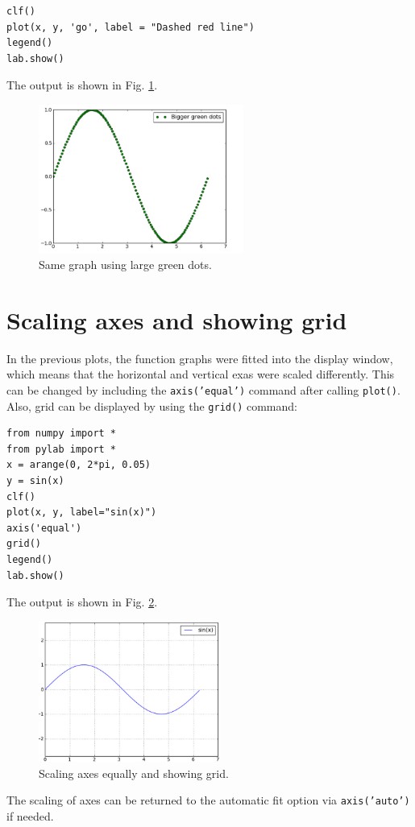 \documentclass{article}
\begin{document}
\begin{verbatim}
clf()
plot(x, y, 'go', label = "Dashed red line")
legend()
lab.show()
\end{verbatim}
\noindent
The output is shown in Fig. \ref{fig:plot5}.

\begin{figure}[!ht]
\begin{center}
\includegraphics[width=0.6\textwidth]{img/plot5.png}
\end{center}
\vspace{-6mm}
\caption{Same graph using large green dots.}
\label{fig:plot5}
\end{figure}
\noindent

\section{Scaling axes and showing grid}

In the previous plots, the function graphs were fitted into the 
display window, which means that the horizontal and vertical 
exas were scaled differently. This can be changed by including the 
{\tt axis('equal')} command after calling {\tt plot()}. Also, 
grid can be displayed by using the {\tt grid()} command:

\begin{verbatim}
from numpy import *
from pylab import *
x = arange(0, 2*pi, 0.05)
y = sin(x)
clf()
plot(x, y, label="sin(x)")
axis('equal')
grid()
legend()
lab.show()
\end{verbatim}
\noindent
The output is shown in Fig. \ref{fig:plot8}.

\begin{figure}[!ht]
\begin{center}
\includegraphics[width=0.53\textwidth]{img/plot8.png}
\end{center}
\vspace{-4mm}
\caption{Scaling axes equally and showing grid.}
\label{fig:plot8}
\end{figure}
\noindent
The scaling of axes can be returned to the automatic fit option via
{\tt axis('auto')} if needed.
\end{document}
